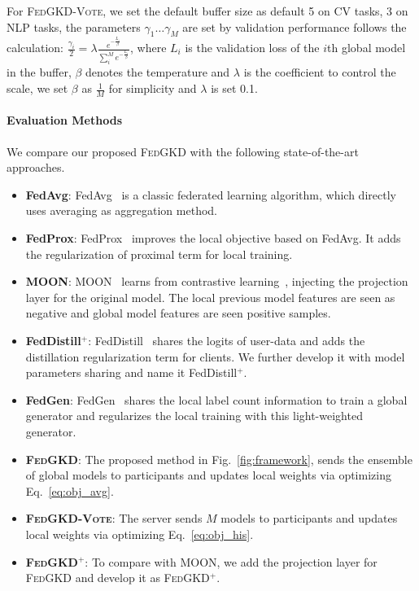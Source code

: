 \documentclass{article} %
\newcommand{\system}{\textsc{FedGKD}\xspace}
\newcommand{\systemled}{\textsc{FedGKD-Vote}\xspace}
\newcommand{\systemplus}{\textsc{FedGKD$^{+}$}\xspace}
\begin{document}
For \systemled, we set the default buffer size as default 5 on CV tasks, 3 on NLP tasks, the parameters $\gamma_1\ldots\gamma_M$ are set by validation performance follows the calculation: $\frac{\gamma_i}{2}=\lambda \frac{e^{-\frac{L_i}{\beta}}}{\sum_i^M{e^{-\frac{L_i}{\beta}}}}$, where $L_i$ is the validation loss of the $i$th global model in the buffer, $\beta$ denotes the temperature and $\lambda$ is the coefficient to control the scale, we set $\beta$ as $\frac{1}{M}$ for simplicity and $\lambda$ is set 0.1.  



\paragraph{Evaluation Methods}
We compare our proposed \system with the following state-of-the-art approaches.
\begin{itemize}
  \item \textbf{FedAvg}: FedAvg~\citep{mcmahan2017communication} is a classic federated learning algorithm, which directly uses averaging as aggregation method.
  \item \textbf{FedProx}: FedProx~\citep{li2018federated} improves the local objective based on FedAvg. It adds the regularization of proximal term for local training.
  \item \textbf{MOON}: MOON~\citep{li2021model} learns from contrastive learning~\citep{chen2020simple}, injecting the projection layer for the original model. The local previous model features are seen as negative and global model features are seen positive samples.
  \item \textbf{FedDistill$^{+}$}: FedDistill~\citep{seo2020federated} shares the logits of user-data and adds the distillation regularization term for clients. We further develop it with model parameters sharing and name it FedDistill$^{+}$.
  \item \textbf{FedGen}: FedGen~\citep{zhu2021data} shares the local label count information to train a global generator and regularizes the local training with this light-weighted generator.
  \item \textbf{\system}: The proposed method in Fig.~\ref{fig:framework}, sends the ensemble of global models to participants and updates local weights via optimizing Eq.~\ref{eq:obj_avg}.
  \item \textbf{\systemled}: The server sends $M$ models to participants and updates local weights via optimizing Eq.~\ref{eq:obj_his}.
  \item \textbf{\systemplus}: To compare with MOON, we add the projection layer for \system and develop it as \systemplus.
\end{itemize}
\end{document}

